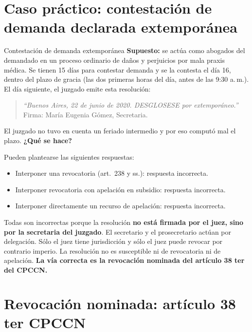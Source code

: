 \documentclass[12pt,oneside]{book}
\begin{document}
\section{Caso pr\'actico: contestaci\'on de demanda declarada extempor\'anea}

\begin{exercise}{Contestaci\'on de demanda extempor\'anea}
\textbf{Supuesto:} se act\'ua como abogados del demandado en un proceso ordinario de da\~nos y perjuicios por mala praxis m\'edica. Se tienen 15 d\'ias para contestar demanda y se la contesta el d\'ia 16, dentro del plazo de gracia (las dos primeras horas del d\'ia, antes de las 9:30 a.\,m.). El d\'ia siguiente, el juzgado emite esta resoluci\'on:

\begin{quote}
\textit{``Buenos Aires, 22 de junio de 2020. DESGLOSESE por extempor\'aneo.''} Firma: Mar\'ia Eugenia G\'omez, Secretaria.
\end{quote}

El juzgado no tuvo en cuenta un feriado intermedio y por eso comput\'o mal el plazo. \textbf{¿Qu\'e se hace?}
\end{exercise}

Pueden plantearse las siguientes respuestas:

\begin{itemize}
    \item Interponer una revocatoria (art.~238 y ss.): respuesta incorrecta.
    \item Interponer revocatoria con apelaci\'on en subsidio: respuesta incorrecta.
    \item Interponer directamente un recurso de apelaci\'on: respuesta incorrecta.
\end{itemize}

\begin{important}
Todas son incorrectas porque la resoluci\'on \textbf{no est\'a firmada por el juez, sino por la secretaria del juzgado}. El secretario y el prosecretario act\'uan por delegaci\'on. S\'olo el juez tiene jurisdicci\'on y s\'olo el juez puede revocar por contrario imperio. La resoluci\'on no es susceptible ni de revocatoria ni de apelaci\'on. \textbf{La v\'ia correcta es la revocaci\'on nominada del art\'iculo 38 ter del CPCCN.}
\end{important}

\section{Revocaci\'on nominada: art\'iculo 38 ter CPCCN}
\end{document}
